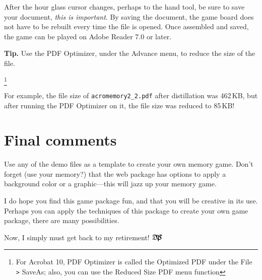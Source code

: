 \documentclass{article}
\def\nhfootnote#1{\begin{NoHyper}\footnote{#1}\end{NoHyper}}
\def\dps{$\hbox{$\mathfrak D$\kern-.3em\hbox{$\mathfrak P$}%
   \kern-.6em \hbox{$\mathcal S$}}$}
\begin{document}
After the hour glass cursor changes, perhaps to the hand tool, be
sure to save your document, \emph{this is important}. By saving the
document, the game board does not have to be rebuilt every
time the file is opened. Once assembled and saved, the game can be
played on Adobe Reader 7.0 or later.

\newtopic\textbf{\color{red}Tip.} Use the \textsf{PDF Optimizer}, under the \textsf{Advance} menu, to
reduce the size of the file.\nhfootnote{For Acrobat 10, \textsf{PDF Optimizer} is called the
\textsf{Optimized PDF} under the \textsf{File \texttt{>} SaveAs}; also, you can use the \textsf{Reduced Size PDF}
menu function} For example, the file size of \texttt{acromemory2\_2.pdf}
after distillation was 462\,KB, but after running the
PDF Optimizer on it, the file size was reduced to 85\,KB!


\section{Final comments}

Use any of the demo files as a template to create your own memory
game. Don't forget (use your memory?) that the \textsf{web} package
has options to apply a background color or a graphic---this will
jazz up your memory game.

I do hope you find this game package fun, and that you will be
creative in its use. Perhaps you can apply the techniques of this
package to create your own game package, there are many
possibilities.

\newtopic Now, I simply must get back to my retirement! \dps
\end{document}
